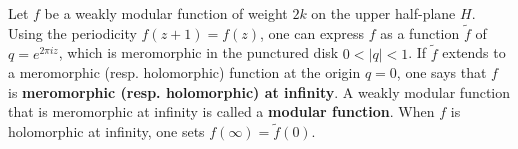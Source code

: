 Let $f$ be a weakly modular function of weight $2k$ on the upper half-plane $H$. Using the periodicity $f(z+1) = f(z)$, one can express $f$ as a function $\tilde{f}$ of $q = e^{2\pi i z}$, which is meromorphic in the punctured disk $0 < |q| < 1$. If $\tilde{f}$ extends to a meromorphic (resp. holomorphic) function at the origin $q = 0$, one says that $f$ is \textbf{meromorphic (resp. holomorphic) at infinity}. A weakly modular function that is meromorphic at infinity is called a \textbf{modular function}. When $f$ is holomorphic at infinity, one sets $f(\infty) = \tilde{f}(0)$.
